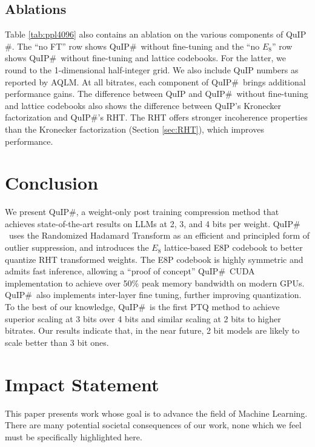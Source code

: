 \subsection{Ablations}

\label{sec:ablations}

Table \ref{tab:ppl4096} also contains an ablation on the various components of QuIP$\#$. 
The ``no FT'' row shows QuIP$\#$\  without fine-tuning and the ``no $E_8$'' row shows QuIP$\#$\  without fine-tuning and lattice codebooks. For the latter, we round to the 1-dimensional half-integer grid. We also include QuIP numbers as reported by AQLM. At all bitrates, each component of QuIP$\#$\  brings additional performance gains. The difference between QuIP and QuIP$\#$\  without fine-tuning and lattice codebooks also shows the difference between QuIP's Kronecker factorization and QuIP$\#$'s RHT. The RHT offers stronger incoherence properties than the Kronecker factorization (Section \ref{sec:RHT}), which improves performance.

\section{Conclusion}
We present QuIP$\#$, a weight-only post training compression method that achieves state-of-the-art results on LLMs at 2, 3, and 4 bits per weight.
QuIP$\#$\  uses the Randomized Hadamard Transform as an efficient and principled form of outlier suppression, and introduces the $E_8$ lattice-based E8P codebook to better quantize RHT transformed weights. The E8P codebook is highly symmetric and admits fast inference, allowing a ``proof of concept'' QuIP$\#$\  CUDA implementation to achieve over 50\% peak memory bandwidth on modern GPUs.
QuIP$\#$\  also implements inter-layer fine tuning, further improving quantization. To the best of our knowledge, QuIP$\#$\  is the first PTQ method to achieve superior scaling at 3 bits over 4 bits and similar scaling at 2 bits to higher bitrates. Our results indicate that, in the near future, 2 bit models are likely to scale better than 3 bit ones.

\section*{Impact Statement} This paper presents work whose goal is to advance the field of Machine Learning. There are many potential societal consequences of our work, none which we feel must be specifically highlighted here.


